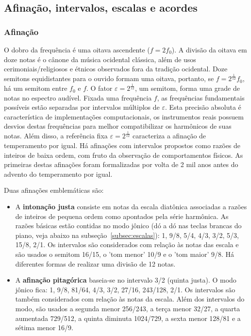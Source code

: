 \subsection{Afinação, intervalos, escalas e acordes}\label{subsec:afinacao}
\subsubsection{Afinação}
O dobro da frequência é uma oitava ascendente ($f=2f_0$).
A divisão da oitava em doze notas é o cânone da música ocidental clássica,
além de usos cerimoniais/religiosos e étnicos observados fora da tradição ocidental.\cite{Wisnick}
Doze semitons equidistantes para o ouvido formam uma oitava,
portanto, se $f=2^{\frac{1}{12}}f_0$, há um semitom entre $f_0$
e $f$.
O fator $\varepsilon=2^{\frac{1}{12}}$, um semitom, forma uma grade de notas
no espectro audível. Fixada uma frequência $f$, as frequências fundamentais possíveis
estão separadas por intervalos múltiplos de $\varepsilon$.
Esta precisão absoluta é característica de implementações
computacionais, os instrumentos reais possuem desvios destas frequências para melhor compatibilizar os harmônicos
de suas notas. Além disso, a referência fixa $\varepsilon=2^{\frac{1}{12}}$ caracteriza
a afinação de temperamento por igual. Há afinações com intervalos propostos como razões de inteiros de baixa ordem, com
fruto da observação de comportamentos físicos.  As primeiras destas afinações foram formalizadas por volta de 2 mil anos antes do advento do temperamento por igual.\cite{Roederer}

Duas afinações emblemáticas são:
\begin{itemize}
    \item A {\bf intonação justa} consiste em notas da escala diatônica associadas a razões de inteiros de pequena ordem como apontados pela série harmônica. As razões básicas estão contidas no modo jônico (dó a dó nas teclas brancas do piano, veja abaixo na subseção~\ref{subsec:escalas}): 1, 9/8, 5/4, 4/3, 3/2, 5/3, 15/8, 2/1. Os intervalos são considerados com relação às notas das escala e são usados o semitom 16/15, o 'tom menor' 10/9 e o 'tom maior' 9/8. Há diferentes formas de realizar uma divisão de 12 notas.
    \item A {\bf afinação pitagórica} baseia-se no intervalo 3/2 (quinta justa). O modo jônico fica: 1, 9/8, 81/64, 4/3, 3/2, 27/16, 243/128, 2/1. Os intervalos são também considerados com relação às notas da escala. Além dos intervalos do modo, são usados a segunda menor 256/243, a terça menor 32/27, a quarta aumentada 729/512, a quinta diminuta 1024/729, a sexta menor 128/81 e a sétima menor 16/9. 
\end{itemize}

